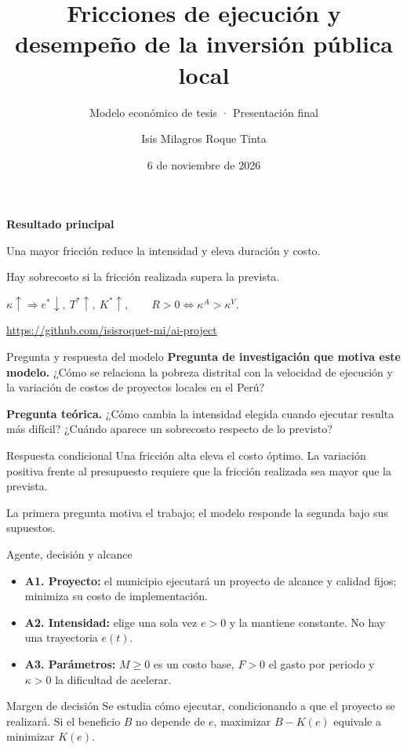 \documentclass[aspectratio=169,11pt]{beamer}
\title{Fricciones de ejecución y desempeño de la inversión pública local}
\subtitle{Modelo económico de tesis · Presentación final}
\author{Isis Milagros Roque Tinta}
\institute{Universidad del Pacífico · Modelamiento Económico}
\date{6 de noviembre de 2026}
\newcommand{\nota}[1]{\par\vfill{\footnotesize\color{blue}#1}}
\begin{document}
\begin{frame}[plain]
\titlepage
\vspace{-1em}
\begin{center}
\small\textbf{Resultado principal}\par\smallskip
Una mayor fricción reduce la intensidad y eleva duración y costo.\par
Hay sobrecosto si la fricción realizada supera la prevista.\par\smallskip
$\kappa\uparrow\Rightarrow e^*\downarrow,\ T^*\uparrow,\ K^*\uparrow,
\qquad R>0\iff\kappa^A>\kappa^V$.\par\medskip
\scriptsize\url{https://github.com/isisroquet-mi/ai-project}
\end{center}
\end{frame}

\begin{frame}{Pregunta y respuesta del modelo}
\textbf{Pregunta de investigación que motiva este modelo.} ¿Cómo se relaciona la pobreza distrital con la velocidad de ejecución y la variación de costos de proyectos locales en el Perú?
\medskip

\textbf{Pregunta teórica.} ¿Cómo cambia la intensidad elegida cuando ejecutar resulta más difícil? ¿Cuándo aparece un sobrecosto respecto de lo previsto?
\begin{block}{Respuesta condicional}
Una fricción alta eleva el costo óptimo. La variación positiva frente al presupuesto requiere que la fricción realizada sea mayor que la prevista.
\end{block}
\nota{La primera pregunta motiva el trabajo; el modelo responde la segunda bajo sus supuestos.}
\end{frame}

\begin{frame}{Agente, decisión y alcance}
\begin{itemize}\setlength{\itemsep}{.8em}
\item \textbf{A1. Proyecto:} el municipio ejecutará un proyecto de alcance y calidad fijos; minimiza su costo de implementación.
\item \textbf{A2. Intensidad:} elige una sola vez $e>0$ y la mantiene constante. No hay una trayectoria $e(t)$.
\item \textbf{A3. Parámetros:} $M\ge0$ es un costo base, $F>0$ el gasto por periodo y $\kappa>0$ la dificultad de acelerar.
\end{itemize}
\begin{block}{Margen de decisión}
Se estudia cómo ejecutar, condicionando a que el proyecto se realizará. Si el beneficio $B$ no depende de $e$, maximizar $B-K(e)$ equivale a minimizar $K(e)$.
\end{block}
\end{frame}
\end{document}
